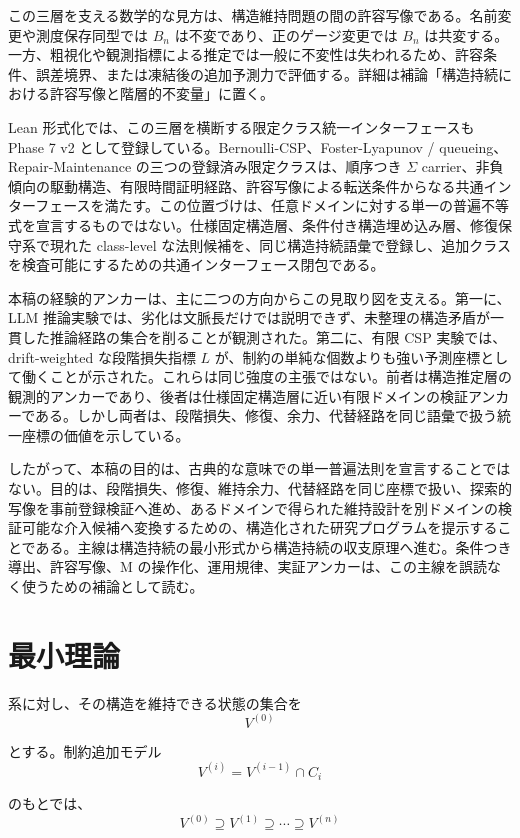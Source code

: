 \documentclass[12pt,a4paper]{article}
\begin{document}
この三層を支える数学的な見方は、構造維持問題の間の許容写像である。名前変更や測度保存同型では \(B_{n}\) は不変であり、正のゲージ変更では \(B_{n}\) は共変する。一方、粗視化や観測指標による推定では一般に不変性は失われるため、許容条件、誤差境界、または凍結後の追加予測力で評価する。詳細は補論「構造持続における許容写像と階層的不変量」に置く。

Lean 形式化では、この三層を横断する限定クラス統一インターフェースも Phase 7 v2 として登録している。Bernoulli-CSP、Foster-Lyapunov / queueing、Repair-Maintenance の三つの登録済み限定クラスは、順序つき \(\Sigma\) carrier、非負傾向の駆動構造、有限時間証明経路、許容写像による転送条件からなる共通インターフェースを満たす。この位置づけは、任意ドメインに対する単一の普遍不等式を宣言するものではない。仕様固定構造層、条件付き構造埋め込み層、修復保守系で現れた class-level な法則候補を、同じ構造持続語彙で登録し、追加クラスを検査可能にするための共通インターフェース閉包である。

本稿の経験的アンカーは、主に二つの方向からこの見取り図を支える。第一に、LLM 推論実験では、劣化は文脈長だけでは説明できず、未整理の構造矛盾が一貫した推論経路の集合を削ることが観測された。第二に、有限 CSP 実験では、drift-weighted な段階損失指標 \(L\) が、制約の単純な個数よりも強い予測座標として働くことが示された。これらは同じ強度の主張ではない。前者は構造推定層の観測的アンカーであり、後者は仕様固定構造層に近い有限ドメインの検証アンカーである。しかし両者は、段階損失、修復、余力、代替経路を同じ語彙で扱う統一座標の価値を示している。

したがって、本稿の目的は、古典的な意味での単一普遍法則を宣言することではない。目的は、段階損失、修復、維持余力、代替経路を同じ座標で扱い、探索的写像を事前登録検証へ進め、あるドメインで得られた維持設計を別ドメインの検証可能な介入候補へ変換するための、構造化された研究プログラムを提示することである。主線は構造持続の最小形式から構造持続の収支原理へ進む。条件つき導出、許容写像、M の操作化、運用規律、実証アンカーは、この主線を誤読なく使うための補論として読む。

\section{最小理論}\label{ux6700ux5c0fux7406ux8ad6}

系に対し、その構造を維持できる状態の集合を \[
V^{(0)}
\]

とする。制約追加モデル \[
V^{(i)} = V^{(i-1)} ∩ C_{i}
\]

のもとでは、 \[
V^{(0)} \supseteq V^{(1)} \supseteq \cdots \supseteq V^{(n)}
\]
\end{document}

